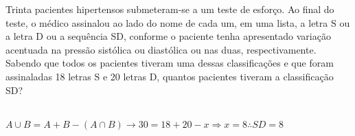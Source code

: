 \begin{ex}
Trinta pacientes hipertensos submeteram-se a um teste de esforço. Ao final do teste, o médico assinalou ao lado do nome de cada um, em uma lista, a letra S ou a letra D ou a sequência SD, conforme o paciente tenha apresentado variação acentuada na pressão sistólica ou diastólica ou nas duas, respectivamente. Sabendo que todos os pacientes tiveram uma dessas classificações e que foram assinaladas 18 letras S e 20 letras D, quantos pacientes tiveram a classificação SD?
  \begin{sol}
  \phantom{A} \\
  $A\cup B=A+B-(A\cap B) \rightarrow 30=18+20-x \Longrightarrow x=8 \therefore SD=8$
  \end{sol}
\end{ex}